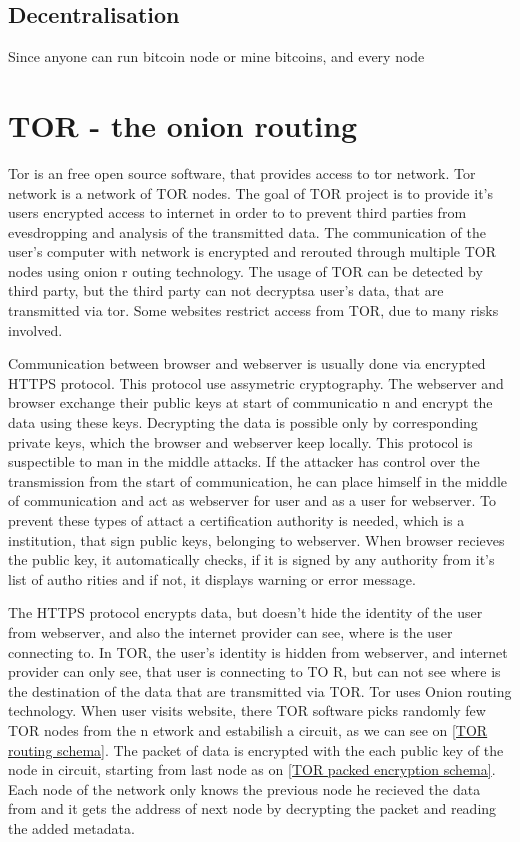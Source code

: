 \documentclass[
  digital, %
  table,   %
  lof,     %
  lot,     %
  oneside
]{fithesis3}
\begin{document}
\subsection{Decentralisation}

Since anyone can run bitcoin node or mine bitcoins, and every node

\section{TOR - the onion routing}

Tor is an free open source software, that provides access to tor network. Tor network is a network of TOR nodes.
The goal of TOR project is to provide it's users encrypted access to internet in order to to prevent third parties
from evesdropping and analysis of the transmitted data.
The communication of the user's computer with network is encrypted and rerouted through multiple TOR nodes using onion r
outing technology.
The usage of TOR can be detected by third party, but the third party can not decryptsa user's data, that are transmitted
 via tor.
Some websites restrict access from TOR, due to many risks involved.

Communication between browser and webserver is usually done via encrypted HTTPS protocol.
This protocol use assymetric cryptography. The webserver and browser exchange their public keys at start of communicatio
n
and encrypt the data using these keys. Decrypting the data is possible only by corresponding private keys,
which the browser and webserver keep locally. This protocol is suspectible to man in the middle attacks.
If the attacker has control over the transmission from the start of communication, he can place himself in the middle
 of communication and act as webserver for user and as a user for webserver. To prevent these types of attact
 a certification authority is needed, which is a institution, that sign public keys, belonging to webserver.
 When browser recieves the public key, it automatically checks, if it is signed by any authority from it's list of autho
rities
 and if not, it displays warning or error message.
 
The HTTPS protocol encrypts data, but doesn't hide the identity of the user from webserver,
 and also the internet provider can see, where is the user connecting to.
 In TOR, the user's identity is hidden from webserver, and internet provider can only see, that user is connecting to TO
R,
 but can not see where is the destination of the data that are transmitted via TOR.
 Tor uses Onion routing technology. When user visits website, there TOR software picks randomly few TOR nodes from the n
etwork
 and estabilish a circuit, as we can see on \ref{TOR routing schema}. 
 The packet of data is encrypted with the each public key of the node in circuit, starting from last node as on \ref{TOR
 packed encryption schema}.
 Each node of the network only knows the previous node he recieved the data from and it gets the address 
 of next node by decrypting the packet and reading the added metadata.
 
\end{document}
